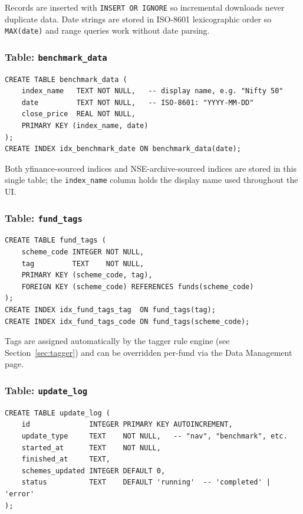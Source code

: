 \documentclass[12pt, a4paper]{article}
\begin{document}
Records are inserted with \texttt{INSERT OR IGNORE} so incremental downloads
never duplicate data.  Date strings are stored in ISO-8601 lexicographic order
so \texttt{MAX(date)} and range queries work without date parsing.

\subsubsection{Table: \texttt{benchmark\_data}}

\begin{lstlisting}[style=sqlcode,caption={benchmark\_data — index close prices}]
CREATE TABLE benchmark_data (
    index_name   TEXT NOT NULL,   -- display name, e.g. "Nifty 50"
    date         TEXT NOT NULL,   -- ISO-8601: "YYYY-MM-DD"
    close_price  REAL NOT NULL,
    PRIMARY KEY (index_name, date)
);
CREATE INDEX idx_benchmark_date ON benchmark_data(date);
\end{lstlisting}

Both yfinance-sourced indices and NSE-archive-sourced indices are stored in
this single table; the \texttt{index\_name} column holds the display name used
throughout the UI.

\subsubsection{Table: \texttt{fund\_tags}}

\begin{lstlisting}[style=sqlcode,caption={fund\_tags — sector/style taxonomy}]
CREATE TABLE fund_tags (
    scheme_code INTEGER NOT NULL,
    tag         TEXT    NOT NULL,
    PRIMARY KEY (scheme_code, tag),
    FOREIGN KEY (scheme_code) REFERENCES funds(scheme_code)
);
CREATE INDEX idx_fund_tags_tag  ON fund_tags(tag);
CREATE INDEX idx_fund_tags_code ON fund_tags(scheme_code);
\end{lstlisting}

Tags are assigned automatically by the tagger rule engine (see
Section~\ref{sec:tagger}) and can be overridden per-fund via the Data
Management page.

\subsubsection{Table: \texttt{update\_log}}

\begin{lstlisting}[style=sqlcode,caption={update\_log — audit trail}]
CREATE TABLE update_log (
    id              INTEGER PRIMARY KEY AUTOINCREMENT,
    update_type     TEXT    NOT NULL,   -- "nav", "benchmark", etc.
    started_at      TEXT    NOT NULL,
    finished_at     TEXT,
    schemes_updated INTEGER DEFAULT 0,
    status          TEXT    DEFAULT 'running'  -- 'completed' | 'error'
);
\end{lstlisting}
\end{document}
